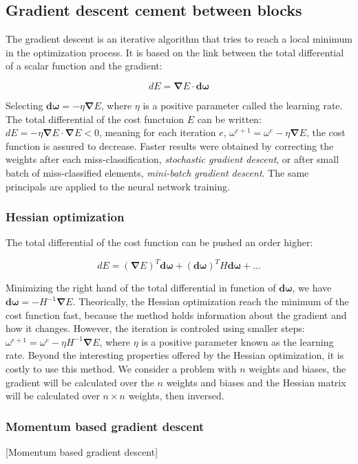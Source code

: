 \documentclass[final, paper=letter,5p,times,twocolumn]{elsarticle}
\begin{document}
\subsection{Gradient descent cement between blocks}

The gradient descent is an iterative algorithm that tries to reach a local minimum in the optimization process. It is based on the link between the total differential of a scalar function and the gradient:

$$
dE = \bm{\nabla}E \cdot \bm{d \omega}
$$

Selecting $\bm{d\omega} = -\eta \bm{\nabla}E$, where $\eta$ is a positive parameter called the learning rate. The total differential of the cost functuion $E$ can be written: $dE = -\eta \bm{\nabla}E \cdot \bm{\nabla}E < 0$, meaning for each iteration $e$, $\omega^{e+1} = \omega^{e} - \eta \bm{\nabla} E$, the cost function is assured to decrease. 
Faster results were obtained by correcting the weights after each miss-classification, {\it stochastic gradient descent}, or after small batch of miss-classified elements, {\it mini-batch gradient descent}. The same principals are applied to the neural network training.\\

\subsubsection{Hessian optimization}

The total differential of the cost function can be pushed an order higher:

$$
dE = (\bm{\nabla}E)^{T} \bm{d \omega} + (\bm{d \omega})^{T}H\bm{d \omega} + \dots
$$

Minimizing the right hand of the total differential in function of $\bm{d \omega}$, we have $\bm{d \omega} = - H^{-1} \bm{\nabla}E$. Theorically, the Hessian optimization reach the minimum of the cost function fast, because the method holds information about the gradient and how it changes. However, the iteration is controled using smaller steps: $\omega^{e+1} = \omega^{e} - \eta  H^{-1} \bm{\nabla}E$, where $\eta$ is a positive parameter known as the learning rate. Beyond the interesting properties offered by the Hessian optimization, it is costly to use this method. We consider a problem with $n$ weights and biases, the gradient will be calculated over the $n$ weights and biases and the Hessian matrix will be calculated over $n \times n$ weights, then inversed.

\subsubsection{Momentum based gradient descent}
[Momentum based gradient descent]
\end{document}
